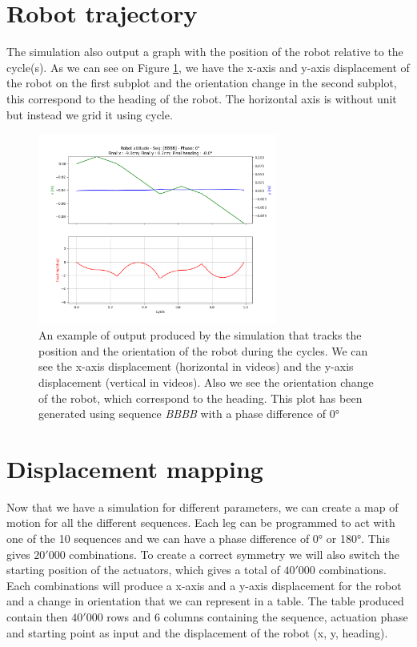     \section{Robot trajectory}\label{sec:res_position}
        The simulation also output a graph with the position of the robot relative to the cycle(s). As we can see on Figure \ref{fig:robot_position}, we have the x-axis and y-axis displacement of the robot on the first subplot and the orientation change in the second subplot, this correspond to the heading of the robot. The horizontal axis is without unit but instead we grid it using cycle.
        \begin{figure}[h]
            \centering
            \includegraphics[width=0.7\textwidth]{images/robot_position.png}
            \caption{An example of output produced by the simulation that tracks the position and the orientation of the robot during the cycles. We can see the x-axis displacement (horizontal in videos) and the y-axis displacement (vertical in videos). Also we see the orientation change of the robot, which correspond to the heading. This plot has been generated using sequence \textit{BBBB} with a phase difference of $0$°}
            \label{fig:robot_position}
        \end{figure}
    
    \section{Displacement mapping}\label{sec:res_mapping}
        Now that we have a simulation for different parameters, we can create a map of motion for all the different sequences. Each leg can be programmed to act with one of the 10 sequences and we can have a phase difference of 0° or 180°. This gives $20'000$ combinations. To create a correct symmetry we will also switch the starting position of the actuators, which gives a total of $40'000$ combinations. Each combinations will produce a x-axis and a y-axis displacement for the robot and a change in orientation that we can represent in a table. The table produced contain then $40'000$ rows and $6$ columns containing the sequence, actuation phase and starting point as input and the displacement of the robot (x, y, heading).
        
